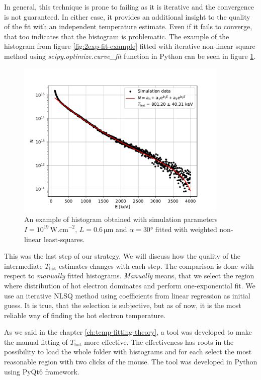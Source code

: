 In general, this technique is prone to failing as it is iterative and the convergence is not guaranteed. In either case, it provides an additional insight to the quality of the fit with an independent temperature estimate. Even if it fails to converge, that too indicates that the histogram is problematic. The example of the histogram from figure \ref{fig:2exp-fit-example} fitted with iterative non-linear square method using \textit{scipy.optimize.curve\_fit} function in Python can be seen in figure \ref{fig:nlsq-fit-example}.
\begin{figure}[t]
	\centering
	\includegraphics[width=0.9\textwidth]{figures/hist_1e19_060_30_nlsq}
	\caption{An example of histogram obtained with simulation parameters $I=10^{19}\,\mathrm{W.cm}^{-2}$, $L=0.6\,\mathrm{\mu m}$ and $\alpha = 30$° fitted with weighted non-linear least-squares.}
	\label{fig:nlsq-fit-example}
\end{figure}

This was the last step of our strategy. We will discuss how the quality of the intermediate $T_{\mathrm{hot}}$ estimates changes with each step. The comparison is done with respect to \textit{manually} fitted histograms. \textit{Manually} means, that we select the region where distribution of hot electron dominates and perform one-exponential fit. We use an iterative NLSQ method using coefficients from linear regression as initial guess. It is true, that the selection is subjective, but as of now, it is the most reliable way of finding the hot electron temperature.

As we said in the chapter \ref{ch:temp-fitting-theory}, a tool was developed to make the manual fitting of $T_{\mathrm{hot}}$ more effective. The effectiveness has roots in the possibility to load the whole folder with histograms and for each select the most reasonable region with two clicks of the mouse. The tool was developed in Python using PyQt6 framework.

